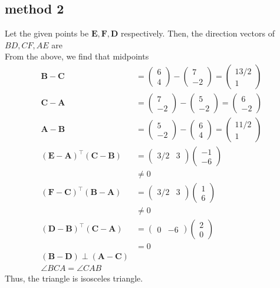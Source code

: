 \documentclass[10pt, a4paper]{article}
\providecommand{\brak}[1]{\ensuremath{\left(#1\right)}}
\newcommand{\myvec}[1]{\ensuremath{\begin{pmatrix}#1\end{pmatrix}}}
\let\vec\mathbf
\begin{document}
\subsection{method 2} Let the given points be $\vec{E}, \vec{F}, \vec{D}$ respectively. 
 Then, the direction vectors of  $BD ,CF,AE$ are
 \\
From the above,  we find that midpoints
\\
\begin{align}
\vec{B}-\vec{C}&= \myvec{6 \\ 4}-\myvec{7 \\-2} = \myvec{13/2 \\ 1}
\\
\vec{C}-\vec{A}&= \myvec{7 \\-2}-\myvec{5 \\-2} = \myvec{6 \\ -2}
\\
\vec{A}-\vec{B}&= \myvec{5 \\ -2} -\myvec{6 \\4} = \myvec{11/2 \\ 1}\
\
\\
\brak{\vec{E}-\vec{A}}^{\top}\brak{\vec{C}-\vec{B}}&= \myvec{3/2 & 3}\myvec{-1 \\ -6}\\
&\neq0\\
\brak{\vec{F}-\vec{C}}^{\top}\brak{\vec{B}-\vec{A}}&= \myvec{3/2 & 3}\myvec{1 \\ 6}\\
&\neq 0\\
\brak{\vec{D}-\vec{B}}^{\top}\brak{\vec{C}-\vec{A}}&= \myvec{0 & -6}\myvec{2 \\ 0}\\
&=0 \\
\brak{\vec{B} -\vec{D}}\perp \brak{\vec{A} -\vec{C}}\\
\angle BCA = \angle CAB  
\end{align}
      Thus, the triangle is isosceles triangle.
 
\end{document}
